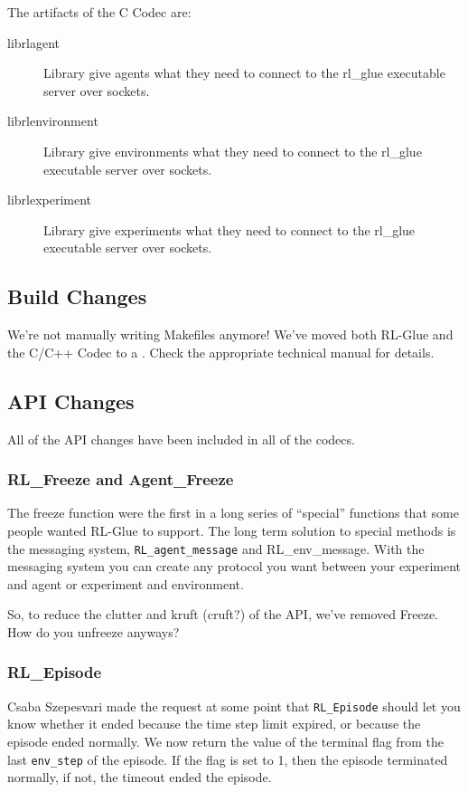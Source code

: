 \documentclass[11pt]{article}
\begin{document}
The artifacts of the C Codec are:
\begin{description}
	\item [librlagent] Library give agents what they need to connect to the rl\_glue executable server over sockets.
	\item [librlenvironment] Library give environments what they need to connect to the rl\_glue executable server over sockets.
	\item [librlexperiment] Library give experiments what they need to connect to the rl\_glue executable server over sockets.
\end{description}

\subsection{Build Changes}
We're not manually writing Makefiles anymore!  We've moved both RL-Glue and the C/C++ Codec to a . Check the appropriate technical manual for details.

\subsection{API Changes}
All of the API changes have been included in all of the codecs.

\subsubsection{RL\_Freeze and Agent\_Freeze}
The freeze function were the first in a long series of ``special'' functions that some people wanted RL-Glue to support.  The long term solution to special methods is the messaging system, \texttt{RL\_agent\_message} and RL\_env\_message. With the messaging system you can create any protocol you want between your experiment and agent or experiment and environment.

So, to reduce the clutter and kruft (cruft?) of the API, we've removed Freeze.  How do you unfreeze anyways?

\subsubsection{RL\_Episode}
Csaba Szepesvari made the request at some point that \texttt{RL\_Episode} should let you know whether it ended because the time step limit expired, or because the episode ended normally.  We now return the value of the terminal flag from the last \texttt{env\_step} of the episode. If the flag is set to 1, then the episode terminated normally, if not, the timeout ended the episode.  
\end{document}
